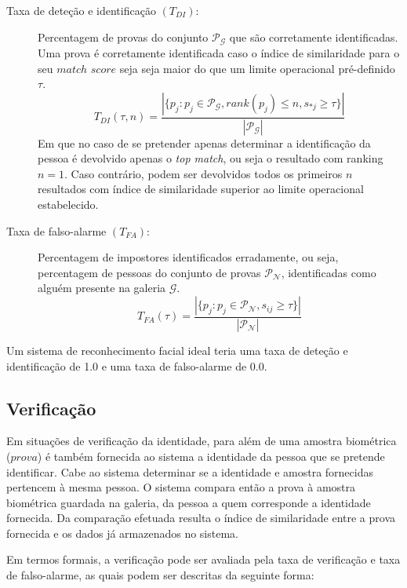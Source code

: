  \begin{description}
 \item[Taxa de deteção e identificação $(T_{DI})$:] Percentagem de provas do conjunto $\mathscr{P}_\mathscr{G}$ que são corretamente  identificadas. Uma prova é corretamente identificada caso o índice de similaridade para o seu $match$ $score$ seja seja maior do que um limite operacional pré-definido $\tau$.
\begin{equation}
 T_{DI}(\tau, n) = \frac{|\{p_j:p_j \in \mathscr{P}_\mathscr{G}, rank(p_j) \leqslant n, s_{*j} \geqslant \tau\}|}{|\mathscr{P}_\mathscr{G}|}
\end{equation}
 Em que no caso de se pretender apenas determinar a identificação da pessoa é devolvido apenas o \textit{top match}, ou seja o resultado com ranking $n=1$. Caso contrário, podem ser devolvidos todos os primeiros $n$ resultados com índice de similaridade superior ao limite operacional estabelecido.
 
  \item[Taxa de falso-alarme $(T_{FA})$:] Percentagem de impostores identificados erradamente, ou seja, percentagem de pessoas do conjunto de provas $\mathscr{P}_\mathscr{N}$, identificadas como alguém presente na galeria $\mathscr{G}$.  
\begin{equation}
 T_{FA}(\tau) = \frac{|\{p_j:p_j \in \mathscr{P}_\mathscr{N}, s_{ij} \geqslant \tau\}|}{|\mathscr{P}_\mathscr{N}|}
\end{equation}
\end{description}

Um sistema de reconhecimento facial ideal teria uma taxa de deteção e identificação de 1.0 e uma taxa de falso-alarme de 0.0.

\subsection{Verificação}
Em situações de verificação da identidade, para além de uma amostra biométrica ($prova$) é também fornecida ao sistema a identidade da pessoa que se pretende identificar. Cabe ao sistema determinar se a identidade e amostra fornecidas pertencem à mesma pessoa. O sistema compara então a prova à amostra biométrica guardada na galeria, da pessoa a quem corresponde a identidade fornecida. Da comparação efetuada resulta o índice de similaridade entre a prova fornecida e os dados já armazenados no sistema.

Em termos formais, a verificação pode ser avaliada pela taxa de verificação e taxa de falso-alarme, as quais podem ser descritas da seguinte forma:

